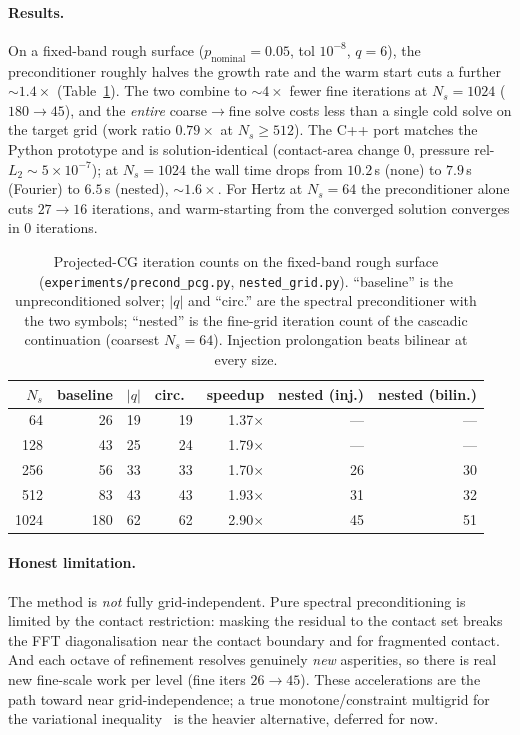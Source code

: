 \documentclass[11pt,a4paper]{article}
\newcommand{\abs}[1]{\left\lvert #1 \right\rvert}
\begin{document}
\paragraph{Results.}
On a fixed-band rough surface ($p_{\text{nominal}}=0.05$, tol $10^{-8}$, $q=6$),
the preconditioner roughly halves the growth rate and the warm start cuts a
further $\sim1.4\times$ (Table~\ref{tab:precond}). The two combine to
$\sim4\times$ fewer fine iterations at $N_s=1024$ ($180\!\to\!45$), and the
\emph{entire} coarse$\to$fine solve costs less than a single cold solve on the
target grid (work ratio $0.79\times$ at $N_s\ge512$). The C++ port matches the
Python prototype and is solution-identical (contact-area change $0$, pressure
rel-$L_2\sim5\times10^{-7}$); at $N_s=1024$ the wall time drops from $10.2$\,s
(none) to $7.9$\,s (Fourier) to $6.5$\,s (nested), $\sim1.6\times$. For Hertz at
$N_s=64$ the preconditioner alone cuts $27\!\to\!16$ iterations, and warm-starting
from the converged solution converges in $0$ iterations.

\begin{table}[h]
\centering
\begin{tabular}{rrrrrrr}
\toprule
$N_s$ & baseline & $\abs{q}$ & circ.\ & speedup & nested (inj.) & nested (bilin.) \\
\midrule
64   & 26  & 19 & 19 & 1.37$\times$ & ---  & ---  \\
128  & 43  & 25 & 24 & 1.79$\times$ & ---  & ---  \\
256  & 56  & 33 & 33 & 1.70$\times$ & 26   & 30   \\
512  & 83  & 43 & 43 & 1.93$\times$ & 31   & 32   \\
1024 & 180 & 62 & 62 & 2.90$\times$ & 45   & 51   \\
\bottomrule
\end{tabular}
\caption{Projected-CG iteration counts on the fixed-band rough surface
(\texttt{experiments/precond\_pcg.py}, \texttt{nested\_grid.py}). ``baseline''
is the unpreconditioned solver; $\abs{q}$ and ``circ.'' are the spectral
preconditioner with the two symbols; ``nested'' is the fine-grid iteration count
of the cascadic continuation (coarsest $N_s{=}64$). Injection prolongation beats
bilinear at every size.}
\label{tab:precond}
\end{table}

\paragraph{Honest limitation.}
The method is \emph{not} fully grid-independent. Pure spectral preconditioning is
limited by the contact restriction: masking the residual to the contact set
breaks the FFT diagonalisation near the contact boundary and for fragmented
contact. And each octave of refinement resolves genuinely \emph{new} asperities,
so there is real new fine-scale work per level (fine iters $26\!\to\!45$). These
accelerations are the path toward near grid-independence; a true
monotone/constraint multigrid for the variational
inequality~\cite{Kornhuber1994,Brandt1977,BornemannDeuflhard1996} is the heavier
alternative, deferred for now.
\end{document}
